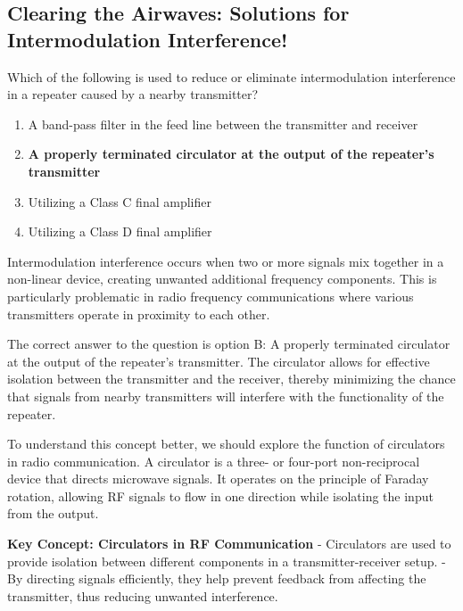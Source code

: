 \subsection{Clearing the Airwaves: Solutions for Intermodulation Interference!}

\begin{tcolorbox}[colback=gray!10, colframe=black, title=E4D04`]
Which of the following is used to reduce or eliminate intermodulation interference in a repeater caused by a nearby transmitter? \\
\begin{enumerate}[label=\Alph*.]
    \item A band-pass filter in the feed line between the transmitter and receiver
    \item \textbf{A properly terminated circulator at the output of the repeater’s transmitter}
    \item Utilizing a Class C final amplifier
    \item Utilizing a Class D final amplifier
\end{enumerate} \end{tcolorbox}

Intermodulation interference occurs when two or more signals mix together in a non-linear device, creating unwanted additional frequency components. This is particularly problematic in radio frequency communications where various transmitters operate in proximity to each other. 

The correct answer to the question is option B: A properly terminated circulator at the output of the repeater’s transmitter. The circulator allows for effective isolation between the transmitter and the receiver, thereby minimizing the chance that signals from nearby transmitters will interfere with the functionality of the repeater.

To understand this concept better, we should explore the function of circulators in radio communication. A circulator is a three- or four-port non-reciprocal device that directs microwave signals. It operates on the principle of Faraday rotation, allowing RF signals to flow in one direction while isolating the input from the output. 

\begin{tcolorbox}
\textbf{Key Concept: Circulators in RF Communication}
- Circulators are used to provide isolation between different components in a transmitter-receiver setup.
- By directing signals efficiently, they help prevent feedback from affecting the transmitter, thus reducing unwanted interference.
\end{tcolorbox}

